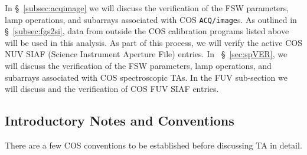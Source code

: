 \documentclass{stsci_report}
\newcommand{\tacq}[1]{\texttt{ACQ/#1}}
\begin{document}
In \S~\ref{subsec:acqimage} we will discuss the verification of the FSW parameters, lamp operations, and subarrays associated with COS \tacq{image}s.
As outlined in \S~\ref{subsec:fgs2si}, data from outside the COS calibration programs listed above will be used in this analysis.
As part of this process, we will verify the active COS NUV SIAF (Science Instrument Aperture File) entries. In ~\S~\ref{sec:spVER},
we will discuss the verification of the FSW parameters, lamp operations, and subarrays associated with COS spectroscopic TAs.
In the FUV sub-section we will discuss and the verification of COS FUV SIAF entries.

\subsection{Introductory Notes and Conventions}\label{sec:intro}
There are a few COS conventions to be established before discussing TA in detail.
\end{document}
